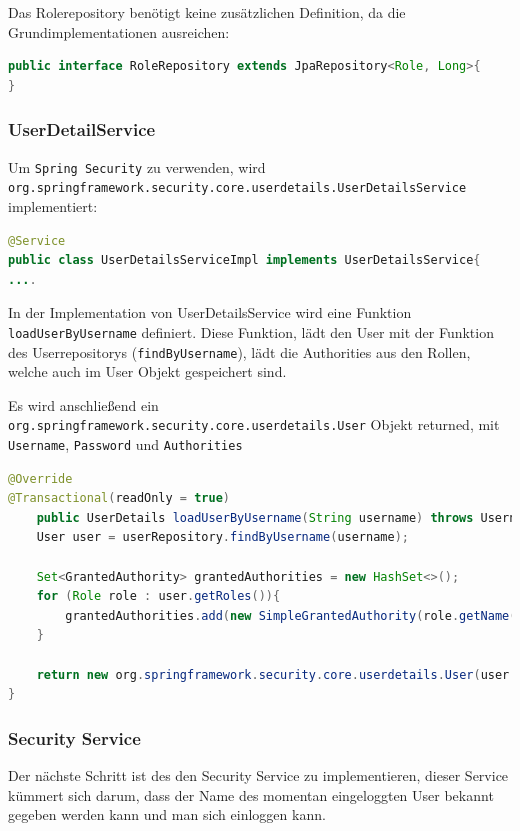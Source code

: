 Das Rolerepository benötigt keine zusätzlichen Definition, da die Grundimplementationen ausreichen:

\begin{lstlisting}[language=Java]
public interface RoleRepository extends JpaRepository<Role, Long>{
}

\end{lstlisting}

\subsubsection{UserDetailService}
Um \verb|Spring Security| zu verwenden, wird\\\verb|org.springframework.security.core.userdetails.UserDetailsService| implementiert:

\begin{lstlisting}[language=Java]
@Service
public class UserDetailsServiceImpl implements UserDetailsService{
....
\end{lstlisting}

In der Implementation von UserDetailsService wird eine Funktion \verb|loadUserByUsername| definiert. Diese Funktion, lädt den User mit der Funktion des Userrepositorys (\verb|findByUsername|), lädt die Authorities aus den Rollen, welche auch im User Objekt gespeichert sind. 

Es wird anschließend ein \verb|org.springframework.security.core.userdetails.User| Objekt returned, mit \verb|Username|, \verb|Password| und \verb|Authorities|

\begin{lstlisting}[language=Java]
@Override
@Transactional(readOnly = true)
	public UserDetails loadUserByUsername(String username) throws UsernameNotFoundException {
	User user = userRepository.findByUsername(username);
	
	Set<GrantedAuthority> grantedAuthorities = new HashSet<>();
	for (Role role : user.getRoles()){
		grantedAuthorities.add(new SimpleGrantedAuthority(role.getName()));
	}
	
	return new org.springframework.security.core.userdetails.User(user.getUsername(), user.getPassword(), grantedAuthorities);
}
	\end{lstlisting}
	
\subsubsection{Security Service}
Der nächste Schritt ist des den Security Service zu implementieren, dieser Service kümmert sich darum, dass der Name des momentan eingeloggten User bekannt gegeben werden kann und man sich einloggen kann.

